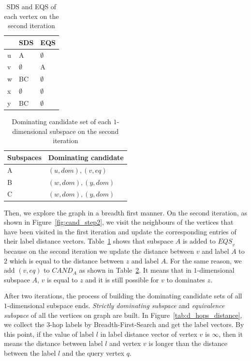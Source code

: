 \begin{table}[H]
    \centering
    \begin{tabular}{|l|l|l|}
    \hline
      & SDS         & EQS         \\ \hline
    u & A           & $\emptyset$ \\ \hline
    v & $\emptyset$ & A           \\ \hline
    w & BC          & $\emptyset$ \\ \hline
    x & $\emptyset$ & $\emptyset$ \\ \hline
    y & BC          & $\emptyset$ \\ \hline
    \end{tabular}
    \caption{SDS and EQS of each vertex on the second iteration}
    \label{tab:sds_step2}
\end{table}

\begin{table}[H]
    \centering

    \begin{tabular}{|l|l|}
    \hline
    Subspaces & Dominating candidate \\ \hline
    A         & $(u, dom), (v, eq)$            \\ \hline
    B         & $(w, dom), (y, dom)$            \\ \hline
    C         & $(w, dom), (y, dom)$            \\ \hline
    \end{tabular}
    \caption{Dominating candidate set of each $1$-dimensional subspace on the second iteration}
    \label{tab:cand_set_step2}
\end{table}


Then, we explore the graph in a breadth first manner. On the second iteration, as shown in Figure~\ref{fig:cand_step2}, we visit the neighbours of the vertices that have been visited in the first iteration and update the corresponding entries of their label distance vectors. Table~\ref{tab:sds_step2} shows that subspace $A$ is added to $\mathit{EQS}_v$ because on the second iteration we update the distance between $v$ and label $A$ to $2$ which is equal to the distance between $z$ and label $A$. For the same reason, we add $(v, eq)$ to $\mathit{CAND}_A$ as shown in Table~\ref{tab:cand_set_step2}. It means that in $1$-dimensional subspace $A$, $v$ is equal to $z$ and it is still possible for $v$ to dominates $z$.

After two iterations, the process of building the dominating candidate sets of all $1$-dimensional subspace ends. \emph{Strictly dominating subspace} and \emph{equivalence subspace} of all the vertices on graph are built. In Figure~\ref{tab:d_hops_distance}, we collect the $3$-hop labels by Breadth-First-Search and get the label vectors. By this point, if the value of label $l$ in label distance vector of vertex $v$ is $\infty$, then it means the distance between label $l$ and vertex $v$ is longer than the distance between the label $l$ and the query vertex $q$.


